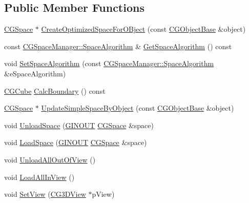 \subsection*{Public Member Functions}
\begin{DoxyCompactItemize}
\item 
\hyperlink{class_c_g_space}{C\+G\+Space} $\ast$ \hyperlink{class_c_g_space_manager_a71d9200f1ec5166b5ffbe603e9cac2a0}{Create\+Optimized\+Space\+For\+O\+Bject} (const \hyperlink{class_c_g_object_base}{C\+G\+Object\+Base} \&object)
\item 
const \hyperlink{class_c_g_space_manager_ad85e12e984c97163d3b89fe639e04987}{C\+G\+Space\+Manager\+::\+Space\+Algorithm} \& \hyperlink{class_c_g_space_manager_a912b679ed9d22615a8f6f2560a7fe273}{Get\+Space\+Algorithm} () const 
\item 
void \hyperlink{class_c_g_space_manager_ac58042529749b9c585c87827fb5e0a10}{Set\+Space\+Algorithm} (const \hyperlink{class_c_g_space_manager_ad85e12e984c97163d3b89fe639e04987}{C\+G\+Space\+Manager\+::\+Space\+Algorithm} \&e\+Space\+Algorithm)
\item 
\hyperlink{class_c_g_cube}{C\+G\+Cube} \hyperlink{class_c_g_space_manager_a2ef45dd7fb5d5a407827f6decbbe2c7f}{Calc\+Boundary} () const 
\item 
\hyperlink{class_c_g_space}{C\+G\+Space} $\ast$ \hyperlink{class_c_g_space_manager_a092a05709c8f883a0c0a196dc1bff43d}{Update\+Simple\+Space\+By\+Object} (const \hyperlink{class_c_g_object_base}{C\+G\+Object\+Base} \&object)
\item 
void \hyperlink{class_c_g_space_manager_a401e578de33371175e18c477ddbb3dec}{Unload\+Space} (\hyperlink{_g_types_8h_a3fc97b512f82d8e1a710da1235f9142a}{G\+I\+N\+O\+U\+T} \hyperlink{class_c_g_space}{C\+G\+Space} \&space)
\item 
void \hyperlink{class_c_g_space_manager_ad5bb441a757f01e6ad36ccb269c231ff}{Load\+Space} (\hyperlink{_g_types_8h_a3fc97b512f82d8e1a710da1235f9142a}{G\+I\+N\+O\+U\+T} \hyperlink{class_c_g_space}{C\+G\+Space} \&space)
\item 
void \hyperlink{class_c_g_space_manager_ac254ca9665560876f351d6c9d519307a}{Unload\+All\+Out\+Of\+View} ()
\item 
void \hyperlink{class_c_g_space_manager_afe4092fce27b865b4722dd9e31b2c765}{Load\+All\+In\+View} ()
\item 
void \hyperlink{class_c_g_space_manager_ab2c8052281b9fe925518d60ae6e05e9e}{Set\+View} (\hyperlink{class_c_g3_d_view}{C\+G3\+D\+View} $\ast$p\+View)
\item 

\end{DoxyCompactItemize}
